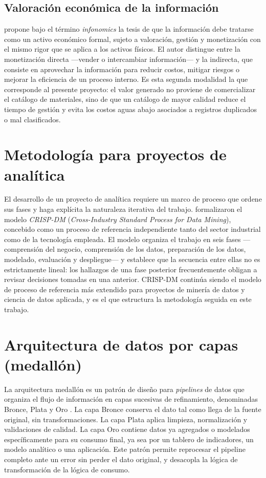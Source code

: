 \subsection{Valoración económica de la información}
 propone bajo el término \textit{infonomics} la tesis de que la información debe tratarse como un activo económico formal, sujeto a valoración, gestión y monetización con el mismo rigor que se aplica a los activos físicos. El autor distingue entre la monetización directa —vender o intercambiar información— y la indirecta, que consiste en aprovechar la información para reducir costos, mitigar riesgos o mejorar la eficiencia de un proceso interno. Es esta segunda modalidad la que corresponde al presente proyecto: el valor generado no proviene de comercializar el catálogo de materiales, sino de que un catálogo de mayor calidad reduce el tiempo de gestión y evita los costos aguas abajo asociados a registros duplicados o mal clasificados.

\section{Metodología para proyectos de analítica}
El desarrollo de un proyecto de analítica requiere un marco de proceso que ordene sus fases y haga explícita la naturaleza iterativa del trabajo.  formalizaron el modelo \textit{CRISP-DM} (\textit{Cross-Industry Standard Process for Data Mining}), concebido como un proceso de referencia independiente tanto del sector industrial como de la tecnología empleada. El modelo organiza el trabajo en seis fases —comprensión del negocio, comprensión de los datos, preparación de los datos, modelado, evaluación y despliegue— y establece que la secuencia entre ellas no es estrictamente lineal: los hallazgos de una fase posterior frecuentemente obligan a revisar decisiones tomadas en una anterior. CRISP-DM continúa siendo el modelo de proceso de referencia más extendido para proyectos de minería de datos y ciencia de datos aplicada, y es el que estructura la metodología seguida en este trabajo.

\section{Arquitectura de datos por capas (medallón)}
La arquitectura medallón es un patrón de diseño para \textit{pipelines} de datos que organiza el flujo de información en capas sucesivas de refinamiento, denominadas Bronce, Plata y Oro \cite{databricks}. La capa Bronce conserva el dato tal como llega de la fuente original, sin transformaciones. La capa Plata aplica limpieza, normalización y validaciones de calidad. La capa Oro contiene datos ya agregados o modelados específicamente para su consumo final, ya sea por un tablero de indicadores, un modelo analítico o una aplicación. Este patrón permite reprocesar el pipeline completo ante un error sin perder el dato original, y desacopla la lógica de transformación de la lógica de consumo.

